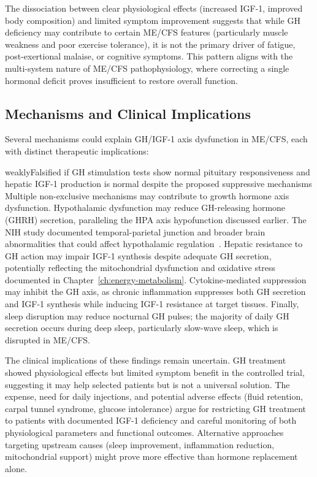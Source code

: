 The dissociation between clear physiological effects (increased IGF-1, improved body composition) and limited symptom improvement suggests that while GH deficiency may contribute to certain ME/CFS features (particularly muscle weakness and poor exercise tolerance), it is not the primary driver of fatigue, post-exertional malaise, or cognitive symptoms. This pattern aligns with the multi-system nature of ME/CFS pathophysiology, where correcting a single hormonal deficit proves insufficient to restore overall function.

\subsection{Mechanisms and Clinical Implications}

Several mechanisms could explain GH/IGF-1 axis dysfunction in ME/CFS, each with distinct therapeutic implications:

\begin{fhypothesis}{weakly}{Falsified if GH stimulation tests show normal pituitary responsiveness and hepatic IGF-1 production is normal despite the proposed suppressive mechanisms}
\label{hyp:gh-mechanisms}
Multiple non-exclusive mechanisms may contribute to growth hormone axis dysfunction. Hypothalamic dysfunction may reduce GH-releasing hormone (GHRH) secretion, paralleling the HPA axis hypofunction discussed earlier. The NIH study documented temporal-parietal junction and broader brain abnormalities that could affect hypothalamic regulation~\cite{walitt2024deep}. Hepatic resistance to GH action may impair IGF-1 synthesis despite adequate GH secretion, potentially reflecting the mitochondrial dysfunction and oxidative stress documented in Chapter~\ref{ch:energy-metabolism}. Cytokine-mediated suppression may inhibit the GH axis, as chronic inflammation suppresses both GH secretion and IGF-1 synthesis while inducing IGF-1 resistance at target tissues. Finally, sleep disruption may reduce nocturnal GH pulses; the majority of daily GH secretion occurs during deep sleep, particularly slow-wave sleep, which is disrupted in ME/CFS.
\end{fhypothesis}

The clinical implications of these findings remain uncertain. GH treatment showed physiological effects but limited symptom benefit in the controlled trial, suggesting it may help selected patients but is not a universal solution. The expense, need for daily injections, and potential adverse effects (fluid retention, carpal tunnel syndrome, glucose intolerance) argue for restricting GH treatment to patients with documented IGF-1 deficiency and careful monitoring of both physiological parameters and functional outcomes. Alternative approaches targeting upstream causes (sleep improvement, inflammation reduction, mitochondrial support) might prove more effective than hormone replacement alone.

